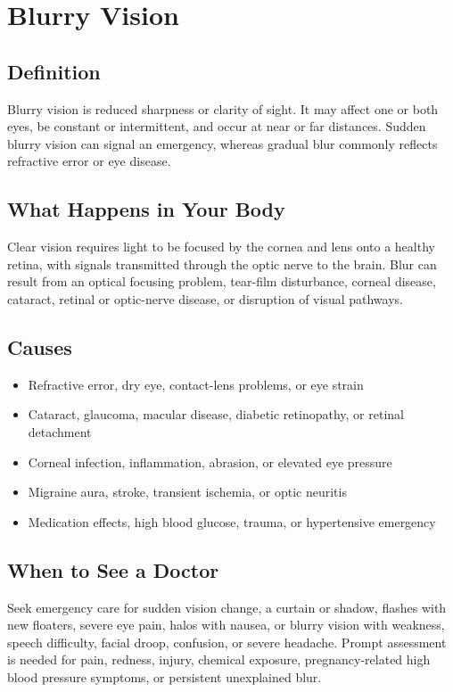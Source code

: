 \chapter{Blurry Vision}

\section*{Definition}
Blurry vision is reduced sharpness or clarity of sight. It may affect one or both eyes, be constant or intermittent, and occur at near or far distances. Sudden blurry vision can signal an emergency, whereas gradual blur commonly reflects refractive error or eye disease.

\section*{What Happens in Your Body}
Clear vision requires light to be focused by the cornea and lens onto a healthy retina, with signals transmitted through the optic nerve to the brain. Blur can result from an optical focusing problem, tear-film disturbance, corneal disease, cataract, retinal or optic-nerve disease, or disruption of visual pathways.

\section*{Causes}
\begin{itemize}
  \item Refractive error, dry eye, contact-lens problems, or eye strain
  \item Cataract, glaucoma, macular disease, diabetic retinopathy, or retinal detachment
  \item Corneal infection, inflammation, abrasion, or elevated eye pressure
  \item Migraine aura, stroke, transient ischemia, or optic neuritis
  \item Medication effects, high blood glucose, trauma, or hypertensive emergency
\end{itemize}

\section*{When to See a Doctor}
Seek emergency care for sudden vision change, a curtain or shadow, flashes with new floaters, severe eye pain, halos with nausea, or blurry vision with weakness, speech difficulty, facial droop, confusion, or severe headache. Prompt assessment is needed for pain, redness, injury, chemical exposure, pregnancy-related high blood pressure symptoms, or persistent unexplained blur.

